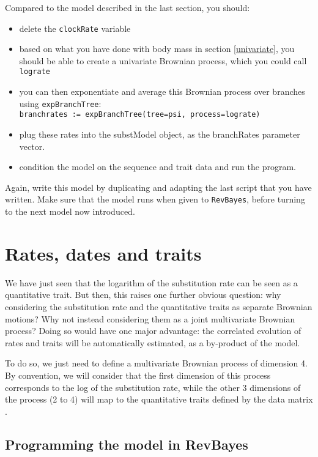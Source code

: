 \documentclass[usletter]{article}
\newcommand{\cmd}[1]{\texttt{#1}}
\begin{document}
Compared to the model described in the last section, you should:
\begin{itemize}
\item
delete the \cmd{clockRate} variable
\item
based on what you have done with body mass in section \ref{univariate}, you should be able to create a univariate Brownian process, which you could call \cmd{lograte}
\item
you can then exponentiate and average this Brownian process over branches using \cmd{expBranchTree}:
\\
\cmd{branchrates := expBranchTree(tree=psi, process=lograte)}
\item
plug these rates into the substModel object, as the branchRates parameter vector.
\item
condition the model on the sequence and trait data and run the program.
\end{itemize}
Again, write this model by duplicating and adapting the last script that you have written. Make sure that the model runs when given to \cmd{RevBayes}, before turning to the next model now introduced.

\section{Rates, dates and traits}

We have just seen that the logarithm of the substitution rate can be seen as a quantitative trait. But then, this raises one further obvious question: why considering the substitution rate and the quantitative traits as separate Brownian motions? Why not instead considering them as a joint multivariate Brownian process? Doing so would have one major advantage: the correlated evolution of rates and traits will be automatically estimated, as a by-product of the model.

To do so, we just need to define a multivariate Brownian process of dimension 4.
By convention, we will consider that the first dimension of this process
corresponds to the log of the substitution rate,
while the other 3 dimensions of the process (2 to 4) will map to the quantitative traits defined by the data matrix
\citep{Lartillot:2011p55}.

\subsection*{Programming the model in RevBayes}
\end{document}
